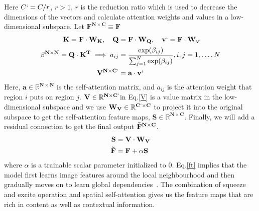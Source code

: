 \documentclass{bmvc2k}
\begin{document}
Here $C` = C / r$, $r > 1$, $r$ is the reduction ratio which is used to decrease the dimensions of the vectors and calculate attention weights and values in a low-dimensional subspace.
Let $\mathbf{F^{N\times C}}\equiv \mathbf{F}$ 
\begin{align}
    \mathbf{K} = \mathbf{F \cdot W_K}, \quad \mathbf{Q} &= \mathbf{F \cdot W_Q}, \quad \mathbf{v`} = \mathbf{F \cdot W_{v`}} \\
    \mathbf{\beta^{N\times N}} = \mathbf{Q \cdot K^T} \implies a_{ij} &= \frac{\exp(\beta_{ij})}{\sum_{j=1}^{N}\exp(\beta_{ij})}, i,j=1,\dots,N \\
    \mathbf{V^{N\times C`}} &= \mathbf{a} \cdot \mathbf{v`} \label{V}
\end{align}
Here, $\mathbf{a\in \mathbb{R}^{N\times N}}$ is the self-attention matrix, and $a_{ij}$ is the attention weight that region $i$ puts on region $j$. $\mathbf{V\in \mathbb{R}^{N\times C`}}$in Eq.\ref{V} is a value matrix in the low-dimensional subspace and we use $\mathbf{W_V\in \mathbb{R}^{C`\times C}}$ to project it into the original subspace  to get the self-attention feature maps, $\mathbf{S\in \mathbb{R}^{N\times C}}$. Finally, we will add a residual connection to get the final output $\mathbf{\Tilde{F}^{N\times C}}$.
\begin{align}
    \mathbf{S} &= \mathbf{V} \cdot \mathbf{W_{V}} \label{S}\\
    \mathbf{\Tilde{F}} &= \mathbf{F} + \alpha \mathbf{S} \label{ft}
\end{align}
where $\alpha$ is a trainable scalar parameter initialized to $0$. Eq.\ref{ft} implies that the model first learns image features around the local neighbourhood and then gradually moves on to learn global dependencies~\cite{sagan}. The combination of squeeze and excite operation and spatial self-attention gives us the feature maps that are rich in content as well as contextual information. 
\end{document}
